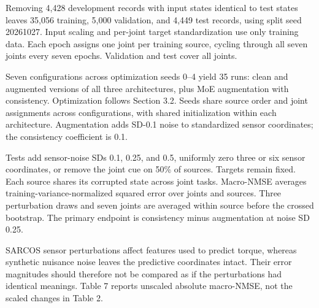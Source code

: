 \documentclass[10pt,letterpaper]{article}
\begin{document}
Removing 4,428 development records with input states identical to test states leaves 35,056 training, 5,000 validation, and 4,449 test records, using split seed 20261027. Input scaling and per-joint target standardization use only training data. Each epoch assigns one joint per training source, cycling through all seven joints every seven epochs. Validation and test cover all joints.


Seven configurations across optimization seeds 0--4 yield 35 runs: clean and augmented versions of all three architectures, plus MoE augmentation with consistency. Optimization follows Section 3.2. Seeds share source order and joint assignments across configurations, with shared initialization within each architecture. Augmentation adds SD-0.1 noise to standardized sensor coordinates; the consistency coefficient is 0.1.


Tests add sensor-noise SDs 0.1, 0.25, and 0.5, uniformly zero three or six sensor coordinates, or remove the joint cue on 50\% of sources. Targets remain fixed. Each source shares its corrupted state across joint tasks. Macro-NMSE averages training-variance-normalized squared error over joints and sources. Three perturbation draws and seven joints are averaged within source before the crossed bootstrap. The primary endpoint is consistency minus augmentation at noise SD 0.25.


SARCOS sensor perturbations affect features used to predict torque, whereas synthetic nuisance noise leaves the predictive coordinates intact. Their error magnitudes should therefore not be compared as if the perturbations had identical meanings. Table 7 reports unscaled absolute macro-NMSE, not the scaled changes in Table 2.
\end{document}
